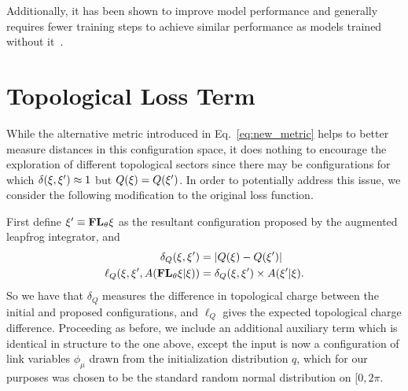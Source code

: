 \begin{appendices}
Additionally, it has been shown to improve model performance and generally
requires fewer training steps to achieve similar performance as models trained
without it~\cite{Ioffe_Szegedy_2015}.

\section{Topological Loss Term}%
\label{sec:topological_loss}
While the alternative metric introduced in Eq.~\ref{eq:new_metric} helps to
better measure distances in this configuration space, it does nothing to
encourage the exploration of different topological sectors since there may be
configurations for which $\delta(\xi, {\xi^{\prime}}) \approx 1$ but $Q(\xi) = Q({\xi^{\prime}})$.
%
In order to potentially address this issue, we consider the following
modification to the original loss function.

First define ${\xi^{\prime}}\equiv {\mathbf{FL}_{\theta}} \xi$ as the resultant configuration proposed by
the augmented leapfrog integrator, and
%
\begin{align}
\delta_{Q}{(\xi, \xi^{\prime})} &= \left|Q{(\xi)} - Q{(\xi^{\prime})}\right| \\
\ell_{Q}{\left(\xi, {\xi^{\prime}}, A{({\mathbf{FL}_{\theta}}\xi|\xi)}\right)} &= \delta_{Q}{(\xi,{\xi^{\prime}})}
  \times A{({\xi^{\prime}}|\xi)}.
\end{align}
%
So we have that $\delta_{Q}$ measures the difference in topological charge
between the initial and proposed configurations, and $\ell_{Q}$ gives the
expected topological charge difference.
%
Proceeding as before, we include an additional auxiliary term which is
identical in structure to the one above, except the input is now a
configuration of link variables $\phi_{\mu}$ drawn from the initialization
distribution $q$, which for our purposes was chosen to be the standard random
normal distribution on $[0, 2\pi$. %


\end{appendices}
